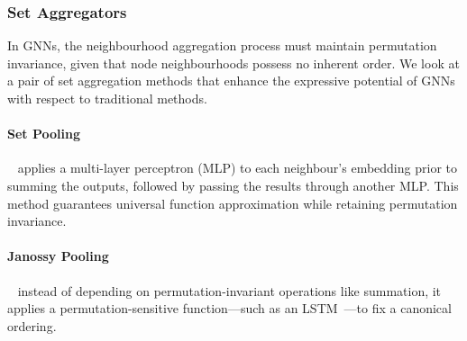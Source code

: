 \subsubsection{Set Aggregators}
In GNNs, the neighbourhood aggregation process must maintain permutation invariance, given that node neighbourhoods possess no inherent order. We look at a pair of set aggregation methods that enhance the expressive potential of GNNs with respect to traditional methods. 

\paragraph{Set Pooling}~\cite{zaheer2017deepSets} applies a multi-layer perceptron (MLP) to each neighbour’s embedding prior to summing the outputs, followed by passing the results through another MLP. This method guarantees universal function approximation while retaining permutation invariance. 

\paragraph{Janossy Pooling}~\cite{murphy2018janossyPooling} instead of depending on permutation-invariant operations like summation, it applies a permutation-sensitive function—such as an LSTM~\cite{hochreiter1997LSTM}—to fix a canonical ordering.

